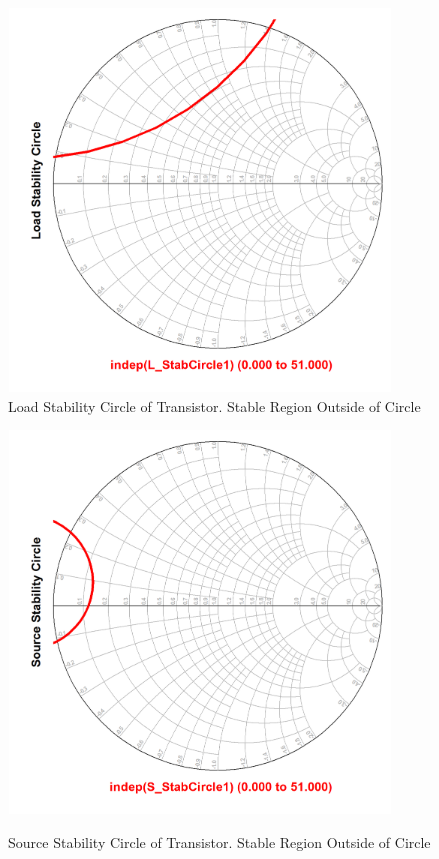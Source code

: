 \begin{figure}
  \centering
  \includegraphics[width=4in,height=4in,keepaspectratio]{figures/simulation/load_stab}\\
  \caption{Load Stability Circle of Transistor. Stable Region Outside of Circle}
  \label{fig:load_stab}

  \vspace*{\floatsep}

  \centering
  \includegraphics[width=4in,height=4in,keepaspectratio]{figures/simulation/source_stab}\\
  \caption{Source Stability Circle of Transistor. Stable Region Outside of Circle}
  \label{fig:source_stab}
\end{figure}

